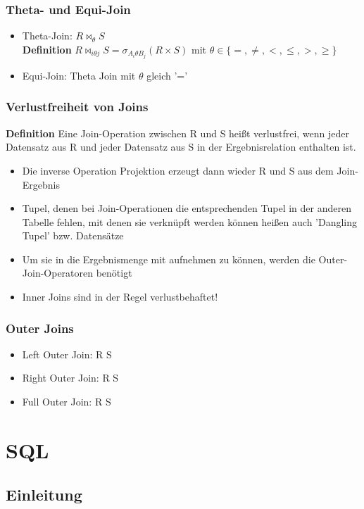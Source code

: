 \subsubsection{Theta- und Equi-Join}
\begin{itemize}
	\item Theta-Join: \(R \bowtie_\theta S\)\\
	\textbf{Definition} \(R\bowtie_{i\theta j}S = \sigma_{A_i\theta B_j}(R\times S)\) mit \(\theta \in \{=, \ne, <, \le, >, \ge \}\)
	\item Equi-Join: Theta Join mit \(\theta\) gleich '='
\end{itemize}
\subsubsection{Verlustfreiheit von Joins}
\textbf{Definition} Eine Join-Operation zwischen R und S heißt verlustfrei, wenn jeder Datensatz aus R und jeder Datensatz aus S in der Ergebnisrelation enthalten ist.
\begin{itemize}
	\item Die inverse Operation Projektion erzeugt dann wieder R und S aus dem Join-Ergebnis
	\item Tupel, denen bei Join-Operationen die entsprechenden Tupel in der anderen Tabelle fehlen, mit denen sie verknüpft werden können heißen auch 'Dangling Tupel' bzw. Datensätze
	\item Um sie in die Ergebnismenge mit aufnehmen zu können, werden die Outer-Join-Operatoren benötigt
	\item Inner Joins sind in der Regel verlustbehaftet!
\end{itemize}
\subsubsection{Outer Joins}
\begin{itemize}
	\item Left Outer Join: R {\tiny {}} S
	\item Right Outer Join: R {\tiny {}} S
	\item Full Outer Join: R {\tiny {}} S
\end{itemize}

\section{SQL}
\subsection{Einleitung}

